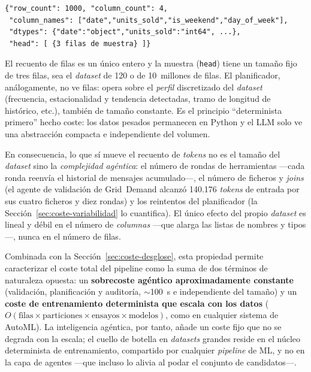 \begin{lstlisting}[caption={Resumen que recibe el LLM para un dataset de 1.000
 filas: recuentos, nombres de columna, tipos y una muestra fija de tres filas.},
 label=lst:load-dataset, basicstyle=\footnotesize\ttfamily, breaklines=true]
{"row_count": 1000, "column_count": 4,
 "column_names": ["date","units_sold","is_weekend","day_of_week"],
 "dtypes": {"date":"object","units_sold":"int64", ...},
 "head": [ {3 filas de muestra} ]}
\end{lstlisting}

El recuento de filas es un único entero y la muestra (\texttt{head}) tiene un tamaño
fijo de tres filas, sea el \textit{dataset} de 120 o de 10~millones de filas. El
planificador, análogamente, no ve filas: opera sobre el \emph{perfil} discretizado del
\textit{dataset} (frecuencia, estacionalidad y tendencia detectadas, tramo de longitud de
histórico, etc.), también de tamaño constante. Es el principio ``determinista primero''
hecho coste: los datos pesados permanecen en Python y el LLM solo ve una abstracción
compacta e independiente del volumen.

En consecuencia, lo que sí mueve el recuento de \textit{tokens} no es el tamaño del
\textit{dataset} sino la \emph{complejidad agéntica}: el número de rondas de herramientas
—cada ronda reenvía el historial de mensajes acumulado—, el número de ficheros y
\textit{joins} (el agente de validación de Grid~Demand alcanzó 140.176 \textit{tokens} de
entrada por sus cuatro ficheros y diez rondas) y los reintentos del planificador (la
Sección~\ref{sec:coste-variabilidad} lo cuantifica). El único efecto del propio
\textit{dataset} es lineal y débil en el número de \emph{columnas} —que alarga las listas
de nombres y tipos—, nunca en el número de filas.

Combinada con la Sección~\ref{sec:coste-desglose}, esta propiedad permite caracterizar el
coste total del pipeline como la suma de dos términos de naturaleza opuesta: un
\textbf{sobrecoste agéntico aproximadamente constante} (validación, planificación y
auditoría, $\sim$100~s e independiente del tamaño) y un \textbf{coste de entrenamiento
determinista que escala con los datos} ($O(\text{filas}\times\text{particiones}\times
\text{ensayos}\times\text{modelos})$, como en cualquier sistema de AutoML). La inteligencia
agéntica, por tanto, añade un coste fijo que no se degrada con la escala; el cuello de
botella en \textit{datasets} grandes reside en el núcleo determinista de entrenamiento,
compartido por cualquier \textit{pipeline} de ML, y no en la capa de agentes —que incluso
lo alivia al podar el conjunto de candidatos—.

